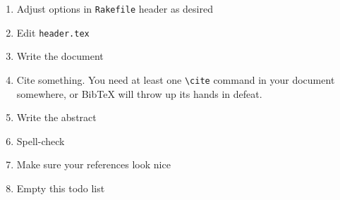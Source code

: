 \begin{enumerate}
\item Adjust options in \verb+Rakefile+ header as desired
\item Edit \verb+header.tex+
\item Write the document
\item Cite something. \cite[p.~999]{source} You need at least one \verb+\cite+ command in your document somewhere, or BibTeX will throw up its hands in defeat.
\item Write the abstract
\item Spell-check
\item Make sure your references look nice
\item Empty this todo list
\end{enumerate}
